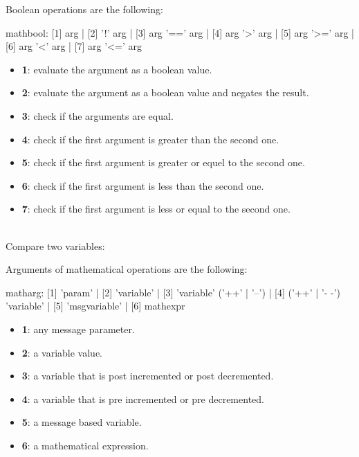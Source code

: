 Boolean operations are the following:
\begin{rail}
mathbool:     [1] arg
			| [2] '!' arg
			| [3] arg '==' arg
			| [4] arg '>' arg
			| [5] arg '>=' arg
			| [6] arg '<' arg
			| [7] arg '<=' arg
\end{rail}

\begin{itemize}
\item \textbf{1}: evaluate the argument as a boolean value.
\item \textbf{2}: evaluate the argument as a boolean value and negates the result.
\item \textbf{3}: check if the arguments are equal.
\item \textbf{4}: check if the first argument is greater than the second one.
\item \textbf{5}: check if the first argument is greater or equel to the second one.
\item \textbf{6}: check if the first argument is less than the second one.
\item \textbf{7}: check if the first argument is less or equal to the second one.
\end{itemize}

\example\\
Compare two variables:


\label{mathargs}

Arguments of mathematical operations are the following:

\begin{rail}
matharg:      [1] 'param'
			| [2] 'variable'
			| [3] 'variable' ('++' | '--')
			| [4] ('++' | '- -') 'variable' 
			| [5] 'msgvariable'
			| [6] mathexpr
\end{rail}
\begin{itemize}
\item \textbf{1}: any message parameter.
\item \textbf{2}: a variable value.
\item \textbf{3}: a variable that is post incremented or post decremented.
\item \textbf{4}: a variable that is pre incremented or pre decremented.
\item \textbf{5}: a message based variable.
\item \textbf{6}: a mathematical expression.
\end{itemize}



